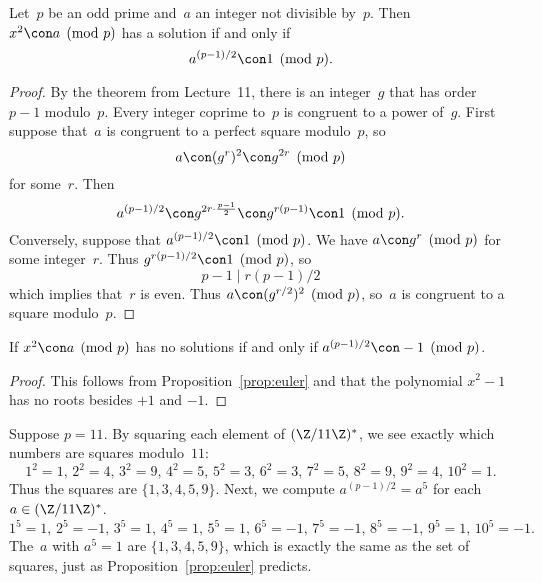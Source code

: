 \documentclass[11pt]{report}
\begin{document}
\begin{proposition}\label{prop:euler}
  Let~$p$ be an odd prime and~$a$ an integer not divisible by~$p$.
  Then $x^2\con a\pmod{p}$ has a solution if and only if
  $$
    a^{(p-1)/2}\con 1\pmod{p}.
  $$
\end{proposition}
\begin{proof}
  By the theorem from Lecture~11, there is an integer~$g$ that
  has order~$p-1$ modulo~$p$.  Every integer coprime to~$p$ is
  congruent to a power of~$g$.
  First suppose that~$a$ is congruent to a perfect square modulo~$p$,
  so
  $$
    a\con (g^r)^2 \con g^{2r}\pmod{p}
  $$
  for some~$r$.  Then
  $$
    a^{(p-1)/2} \con g^{2r\cdot\frac{p-1}{2}} \con
    g^{r(p-1)}\con 1\pmod{p}.
  $$
  Conversely, suppose that
  $a^{(p-1)/2}\con 1\pmod{p}$.  We have
  $a\con g^r \pmod{p}$ for some integer~$r$.
  Thus $g^{r(p-1)/2}\con 1\pmod{p}$, so
  $$
    p-1 \mid r(p-1)/2
  $$
  which implies that~$r$ is even.
  Thus $a\con (g^{r/2})^2\pmod{p}$, so~$a$
  is congruent to a square modulo~$p$.
\end{proof}

\begin{corollary}
  If $x^2\con a\pmod{p}$ has no solutions if and only if $a^{(p-1)/2}\con
    -1\pmod{p}$.
\end{corollary}
\begin{proof}
  This follows from Proposition~\ref{prop:euler} and that
  the polynomial $x^2-1$ has no roots besides $+1$ and $-1$.
\end{proof}



\begin{example}
  Suppose $p=11$.
  By squaring each element of $(\Z/11\Z)^*$, we see
  exactly which numbers are squares modulo~$11$:
  $$
    1^2 = 1,\, 2^2 = 4,\, 3^2 = 9,\, 4^2 = 5,\, 5^2 = 3,\, 6^2 = 3,\,
    7^2 = 5,\, 8^2 = 9,\, 9^2 = 4,\, 10^2 = 1.
  $$
  Thus the squares are $\{1,3,4,5,9\}$.
  Next, we compute $a^{(p-1)/2}=a^{5}$ for each $a\in(\Z/11\Z)^*$.
  $$
    1^{5} = 1,\, 2^{5} = -1,\, 3^{5} = 1,\, 4^{5} = 1,\, 5^{5} = 1,\,
    6^{5} = -1,\, 7^{5} = -1,\, 8^{5} = -1,\, 9^{5} = 1,\, 10^{5} = -1.
  $$
  The~$a$ with $a^5=1$ are $\{1, 3, 4, 5, 9\}$, which is exactly the
  same as the set of squares, just as Proposition~\ref{prop:euler}
  predicts.

\end{example}
\end{document}
